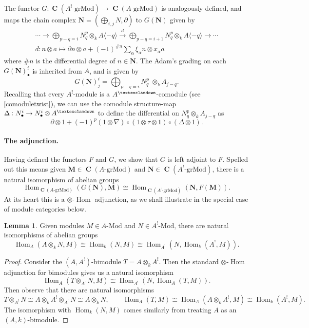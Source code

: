 \documentclass[a4paper]{article}
\theoremstyle{definition}
\newtheorem{lemma}[defn]{Lemma}
\theoremstyle{remark}
\newcommand{\grMod}{\ensuremath{\text{-grMod}}}
\newcommand{\Mod}{\ensuremath{\text{-Mod}}}
\DeclareMathOperator{\Hom}{\text{Hom}}
\DeclareMathOperator{\Ch}{\mathbf{C}}
\newcommand{\gnab}{{\textexclamdown}}
\begin{document}
The functor \(G:\Ch(A^!\grMod)\rightarrow \Ch(A\grMod)\) is analogously defined,
and maps the chain complex \(\mathbf{N}=(\bigoplus_{i,j}N, \partial)\) to \(G(\mathbf{N})\) given by
\begin{gather}
    \cdots \rightarrow \bigoplus_{p-q=i} N^p_q \otimes_k A\langle -q \rangle
    \xrightarrow{\;d\;} \bigoplus_{p-q=i+1}N^p_q \otimes_k A\langle -q \rangle
    \rightarrow \cdots  \label{def-G} \\
    d: n\otimes a \longmapsto \partial n\otimes a + (-1)^{\#n} \sum_\alpha
    \xi_\alpha n \otimes x_\alpha a \nonumber
\end{gather}
where \(\#n\) is the differential degree of \(n\in \mathbf{N}\). The Adam's
grading on each \(G(\mathbf{N})^i_\bullet\) is inherited from \(A\), and is
given by
\[G(\mathbf{N})^i_j =   \bigoplus_{p-q=i}N^p_q \; \otimes_k A_{j-q}.\]
Recalling that every \(A^!\)-module is a \(A^\gnab\)-comodule (see
\cref{comoduletwist}), we can use the comodule structure-map \(\Delta: N^i_\bullet
\rightarrow N^i_\bullet \otimes A^\gnab \) to define the differential on
\(N^p_q\otimes_k A_{j-q}\) as
\[\partial \otimes 1 + (-1)^{p}(1\otimes \nabla)\circ (1\otimes \tau \otimes
1)\circ(\Delta \otimes 1).\]

\paragraph{The adjunction.} 
Having defined the functors \(F\) and \(G\), we show that \(G\) is left adjoint
to \(F\). Spelled out this means given \(\mathbf{M}\in \Ch(A\grMod)\) and
\(\mathbf{N}\in \Ch(A^!\grMod)\), there is a natural isomorphism of abelian
groups
\[\Hom_{\Ch(A\grMod)}(G(\mathbf{N}), \mathbf{M}) \cong
\Hom_{\Ch(A^!\grMod)}(\mathbf{N}, F(\mathbf{M})).\]
At its heart this is a \(\otimes\)-\(\Hom\) adjunction, as we shall illustrate in
the special case of module categories below. 

\begin{lemma} \label{adjunction-simple}
    Given modules \(M\in A\Mod\) and \(N\in A^!\Mod\), there are natural
    isomorphisms of abelian groups
    \[\Hom_{A}(A\otimes_k N, M) \cong \Hom_k(N,M) \cong \Hom_{A^!}(N,
    \Hom_{k}(A^!,M)).\]
    \begin{proof}
        Consider the \((A,A^!)\)-bimodule \(T=A\otimes_k A^!\). Then the
        standard \(\otimes\)-\(\Hom\) adjunction for bimodules
        \cite{bourbaki_algebra_1989} gives us a natural isomorphism 
        \[\Hom_A(T \otimes_{A^!} N, M) \cong \Hom_{A^!}(N, \Hom_{A}(T,M)).\]
        Then observe that there are natural isomorphisms
        \[T \otimes_{A^!} N \cong A\otimes_k A^! \otimes_{A^!} N \cong A\otimes_k
        N, \qquad \Hom_A(T,M)\cong \Hom_A(A\otimes_k A^!, M)\cong \Hom_k(A^!,M).\]
        The isomorphism with \(\Hom_k(N,M)\) comes similarly from treating \(A\)
        as an \((A,k)\)-bimodule.
    \end{proof}
\end{lemma}
\end{document}
